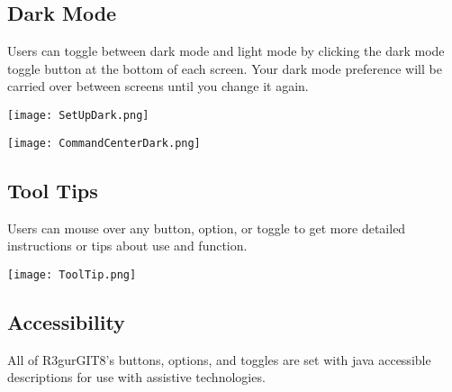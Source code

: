 \documentclass{article}
\begin{document}
\subsection{Dark Mode}
Users can toggle between dark mode and light mode by clicking the dark mode toggle button at the bottom of each screen.  Your dark mode preference will be carried over between screens until you change it again.

\texttt{[image: SetUpDark.png]}

\texttt{[image: CommandCenterDark.png]}

\subsection{Tool Tips}
Users can mouse over any button, option, or toggle to get more detailed instructions or tips about use and function.

\texttt{[image: ToolTip.png]}

\subsection{Accessibility}
All of R3gurGIT8's buttons, options, and toggles are set with java accessible descriptions for use with assistive technologies.
\end{document}
